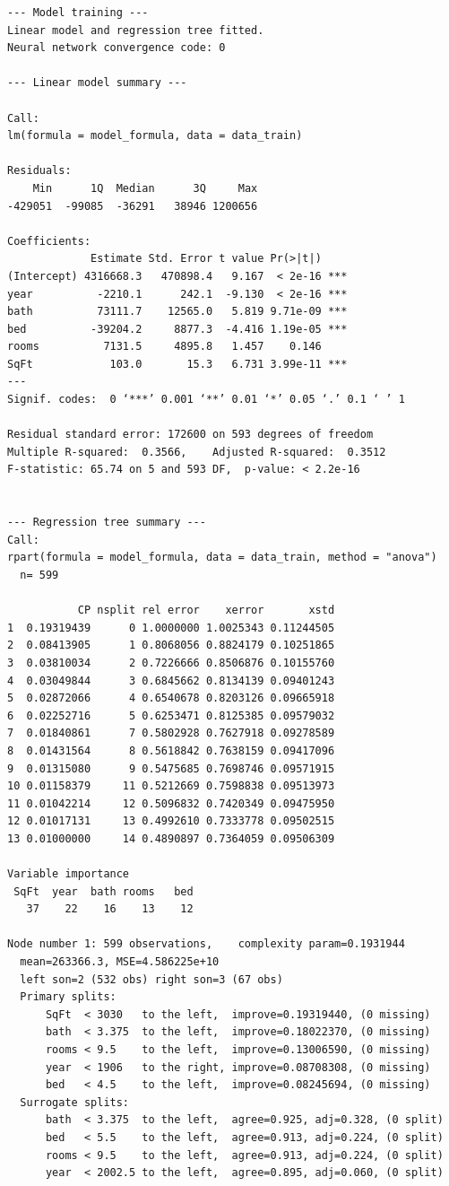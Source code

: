 \documentclass[11pt,a4paper]{article}
\begin{document}
\begin{lstlisting}[style=console]
--- Model training ---
Linear model and regression tree fitted.
Neural network convergence code: 0 

--- Linear model summary ---

Call:
lm(formula = model_formula, data = data_train)

Residuals:
    Min      1Q  Median      3Q     Max 
-429051  -99085  -36291   38946 1200656 

Coefficients:
             Estimate Std. Error t value Pr(>|t|)    
(Intercept) 4316668.3   470898.4   9.167  < 2e-16 ***
year          -2210.1      242.1  -9.130  < 2e-16 ***
bath          73111.7    12565.0   5.819 9.71e-09 ***
bed          -39204.2     8877.3  -4.416 1.19e-05 ***
rooms          7131.5     4895.8   1.457    0.146    
SqFt            103.0       15.3   6.731 3.99e-11 ***
---
Signif. codes:  0 ‘***’ 0.001 ‘**’ 0.01 ‘*’ 0.05 ‘.’ 0.1 ‘ ’ 1

Residual standard error: 172600 on 593 degrees of freedom
Multiple R-squared:  0.3566,	Adjusted R-squared:  0.3512 
F-statistic: 65.74 on 5 and 593 DF,  p-value: < 2.2e-16


--- Regression tree summary ---
Call:
rpart(formula = model_formula, data = data_train, method = "anova")
  n= 599 

           CP nsplit rel error    xerror       xstd
1  0.19319439      0 1.0000000 1.0025343 0.11244505
2  0.08413905      1 0.8068056 0.8824179 0.10251865
3  0.03810034      2 0.7226666 0.8506876 0.10155760
4  0.03049844      3 0.6845662 0.8134139 0.09401243
5  0.02872066      4 0.6540678 0.8203126 0.09665918
6  0.02252716      5 0.6253471 0.8125385 0.09579032
7  0.01840861      7 0.5802928 0.7627918 0.09278589
8  0.01431564      8 0.5618842 0.7638159 0.09417096
9  0.01315080      9 0.5475685 0.7698746 0.09571915
10 0.01158379     11 0.5212669 0.7598838 0.09513973
11 0.01042214     12 0.5096832 0.7420349 0.09475950
12 0.01017131     13 0.4992610 0.7333778 0.09502515
13 0.01000000     14 0.4890897 0.7364059 0.09506309

Variable importance
 SqFt  year  bath rooms   bed 
   37    22    16    13    12 

Node number 1: 599 observations,    complexity param=0.1931944
  mean=263366.3, MSE=4.586225e+10 
  left son=2 (532 obs) right son=3 (67 obs)
  Primary splits:
      SqFt  < 3030   to the left,  improve=0.19319440, (0 missing)
      bath  < 3.375  to the left,  improve=0.18022370, (0 missing)
      rooms < 9.5    to the left,  improve=0.13006590, (0 missing)
      year  < 1906   to the right, improve=0.08708308, (0 missing)
      bed   < 4.5    to the left,  improve=0.08245694, (0 missing)
  Surrogate splits:
      bath  < 3.375  to the left,  agree=0.925, adj=0.328, (0 split)
      bed   < 5.5    to the left,  agree=0.913, adj=0.224, (0 split)
      rooms < 9.5    to the left,  agree=0.913, adj=0.224, (0 split)
      year  < 2002.5 to the left,  agree=0.895, adj=0.060, (0 split)


\end{lstlisting}
\end{document}
